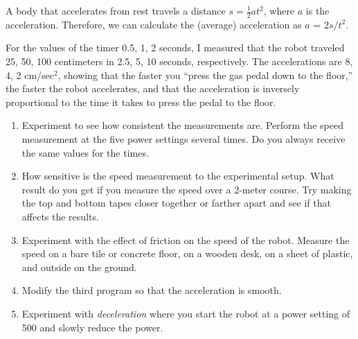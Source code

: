 A body that accelerates from rest travels a distance $s =
\frac{1}{2}at^2$, where $a$ is the acceleration. Therefore, we can
calculate the (average) acceleration as $a$ = $2s/t^2$.

For the values of the timer 0.5, 1, 2 seconds, I measured that the robot
traveled 25, 50, 100 centimeters in 2.5, 5, 10 seconds, respectively.
The accelerations are 8, 4, 2 cm/sec$^2$, showing that the faster you
``press the gas pedal down to the floor,'' the faster the robot
accelerates, and that the acceleration is inversely proportional to the
time it takes to press the pedal to the floor.


\begin{enumerate}

\item Experiment to see how consistent the measurements are.
Perform the speed measurement at the five power settings several times.
Do you always receive the same values for the times.

\item How sensitive is the speed measurement to the experimental setup.
What result do you get if you measure the speed over a 2-meter course.
Try making the top and bottom tapes closer together or farther apart and
see if that affects the results.

\item Experiment with the effect of friction on the speed of the robot.
Measure the speed on a bare tile or concrete floor, on a wooden desk, on
a sheet of plastic, and outside on the ground.

\item Modify the third program so that the acceleration is smooth.

\item Experiment with \emph{deceleration} where you start the robot at a
power setting of 500 and slowly reduce the power.

\end{enumerate}